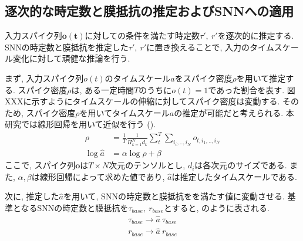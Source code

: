\makeatletter %
\subsection{逐次的な時定数と膜抵抗の推定およびSNNへの適用}
入力スパイク列$\bm{o(t)}$に対しての条件を満たす時定数$\tau',~r'$を逐次的に推定する.
SNNの時定数と膜抵抗を推定した$\tau',~r'$に置き換えることで, 入力のタイムスケール変化に対して頑健な推論を行う.

まず, 入力スパイク列$o(t)$のタイムスケール$a$をスパイク密度$\rho$を用いて推定する.
スパイク密度$\rho$は, ある一定時間$T$のうちに$o(t)=1$であった割合を表す.
図XXXに示すようにタイムスケールの伸縮に対してスパイク密度は変動する.
そのため, スパイク密度$\rho$を用いてタイムスケール$a$の推定が可能だと考えられる.
本研究では線形回帰を用いて近似を行う ().
\begin{equation}
    \begin{split}
        \rho&=\frac{1}{T} \frac{1}{\Pi_{k=1}^{N}d_k} \sum_t^T \sum_{i_i,..,i_N}o_{t,i_1,..,i_N}\\
        \log{\hat{a}}&=\alpha \log{\rho} + \beta
    \end{split}
    \label{sec2:eq:reg}
\end{equation}
ここで, スパイク列$\bm{o}$は$T \times N$次元のテンソルとし, $d_i$は各次元のサイズである.
また, $\alpha, \beta$は線形回帰によって求めた値であり, $\hat{a}$は推定したタイムスケールである.

次に, 推定した$\hat{a}$を用いて, SNNの時定数と膜抵抗をを満たす値に変動させる.
基準となるSNNの時定数と膜抵抗を$\tau_{base},~r_{base}$とすると, のように表される.
\begin{equation}
    \begin{split}
        \tau_{base} \rightarrow \hat{a}~\tau_{base}\\
        r_{base} \rightarrow \hat{a}~r_{base}\\
    \end{split}
    \label{sec2:eq:replace}
\end{equation}